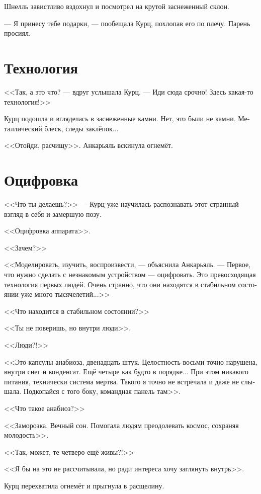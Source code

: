 \documentclass[a4paper,10pt,fleqn]{book}\usepackage{polyglossia}\setdefaultlanguage[babelshorthands=true]{russian}\setotherlanguage{english}\defaultfontfeatures{Ligatures=TeX,Mapping=tex-text}\usepackage{xcolor}\newcommand{\ml}[3]{#2}
\begin{document}
Шнелль завистливо вздохнул и посмотрел на крутой заснеженный склон.

--- Я принесу тебе подарки, --- пообещала Курц, похлопав его по плечу.
Парень просиял.

\section{Технология}

<<Так, а это что? --- вдруг услышала Курц.
--- Иди сюда срочно!
Здесь какая-то технология!>>

Курц подошла и вгляделась в заснеженные камни.
Нет, это были не камни.
Металлический блеск, следы заклёпок...

<<Отойди, расчищу>>.
Анкарьяль вскинула огнемёт.

\section{Оцифровка}

<<Что ты делаешь?>> --- Курц уже научилась распознавать этот странный взгляд в себя и замершую позу.

<<Оцифровка аппарата>>.

<<Зачем?>>

<<Моделировать, изучить, воспроизвести, --- объяснила Анкарьяль.
--- Первое, что нужно сделать с незнакомым устройством --- оцифровать.
Это превосходящая технология первых людей.
Очень странно, что они находятся в стабильном состоянии уже много тысячелетий...>>

<<Что находится в стабильном состоянии?>>

<<Ты не поверишь, но внутри люди>>.

<<Люди?!>>

<<Это капсулы анабиоза, двенадцать штук.
Целостность восьми точно нарушена, внутри снег и конденсат.
Ещё четыре как будто в порядке...
При этом никакого питания, технически система мертва.
Такого я точно не встречала и даже не слышала.
Подкопайся с того боку, командная панель там>>.

<<Что такое анабиоз?>>

<<Заморозка.
Вечный сон.
Помогала людям преодолевать космос, сохраняя молодость>>.

<<Так, может, те четверо ещё живы?!>>

<<Я бы на это не рассчитывала, но ради интереса хочу заглянуть внутрь>>.

Курц перехватила огнемёт и прыгнула в расщелину.
\end{document}
